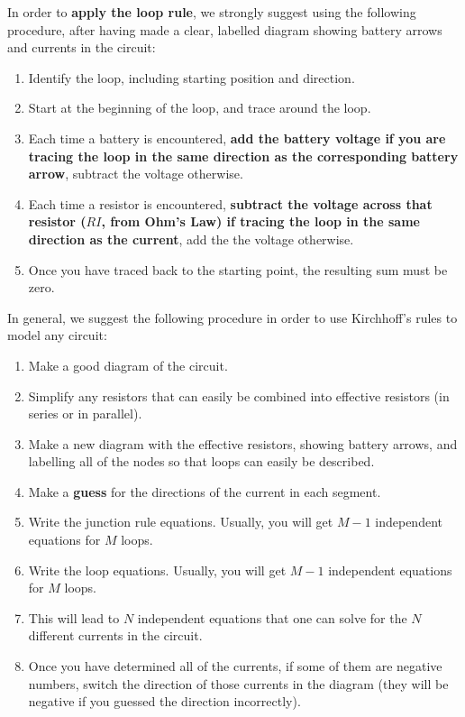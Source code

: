 \begin{chapterSummary}
In order to \textbf{apply the loop rule}, we strongly suggest using the following procedure, after having made a clear, labelled diagram showing battery arrows and currents in the circuit:
\begin{enumerate}
\item Identify the loop, including starting position and direction.
\item Start at the beginning of the loop, and trace around the loop.
\item Each time a battery is encountered, \textbf{add the battery voltage if you are tracing the loop in the same direction as the corresponding battery arrow}, subtract the voltage otherwise.
\item Each time a resistor is encountered, \textbf{subtract the voltage across that resistor ($RI$, from Ohm's Law) if tracing the loop in the same direction as the current}, add the the voltage otherwise.
\item Once you have traced back to the starting point, the resulting sum must be zero.
\end{enumerate}

In general, we suggest the following procedure in order to use Kirchhoff's rules to model any circuit:
\begin{enumerate}
\item Make a good diagram of the circuit.
\item Simplify any resistors that can easily be combined into effective resistors (in series or in parallel).
\item Make a new diagram with the effective resistors, showing battery arrows, and labelling all of the nodes so that loops can easily be described.
\item Make a \textbf{guess} for the directions of the current in each segment.
\item Write the junction rule equations. Usually, you will get $M-1$ independent equations for $M$ loops.
\item Write the loop equations. Usually, you will get $M-1$ independent equations for $M$ loops.
\item This will lead to $N$ independent equations that one can solve for the $N$ different currents in the circuit.
\item Once you have determined all of the currents, if some of them are negative numbers, switch the direction of those currents in the diagram (they will be negative if you guessed the direction incorrectly).
\end{enumerate}


\end{chapterSummary}
